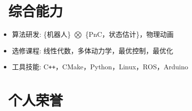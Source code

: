 \documentclass{resume}
\begin{document}
\section{\faCogs\ 综合能力}
\begin{itemize}[parsep=0.5ex]
  \item 算法研发: \{机器人\} $\boldsymbol{\bigotimes}$ \{PnC，状态估计\}，物理动画
  \item 选修课程: 线性代数，多体动力学，最优控制，最优化%
  \item 工具技能: C\texttt{++}，CMake，Python，Linux，ROS，Arduino
\end{itemize}

\section{\faHeartO\ 个人荣誉}
\end{document}
